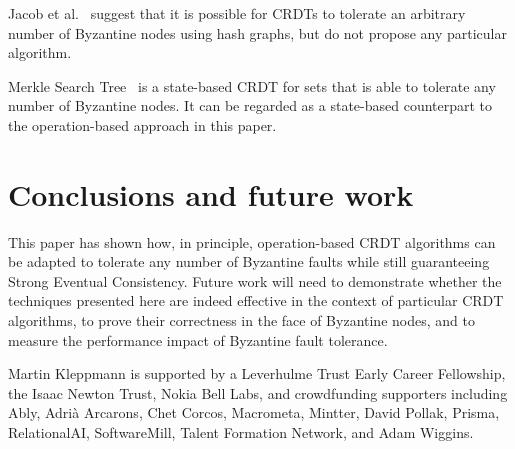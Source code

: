 \documentclass[sigplan,review]{acmart}
\begin{document}
Jacob et al.~\cite{Jacob:2021} suggest that it is possible for CRDTs to tolerate an arbitrary number of Byzantine nodes using hash graphs, but do not propose any particular algorithm.

Merkle Search Tree~\cite{Auvolat:2019} is a state-based CRDT for sets that is able to tolerate any number of Byzantine nodes.
It can be regarded as a state-based counterpart to the operation-based approach in this paper.

\section{Conclusions and future work}\label{sec:conclusions}

This paper has shown how, in principle, operation-based CRDT algorithms can be adapted to tolerate any number of Byzantine faults while still guaranteeing Strong Eventual Consistency.
Future work will need to demonstrate whether the techniques presented here are indeed effective in the context of particular CRDT algorithms, to prove their correctness in the face of Byzantine nodes, and to measure the performance impact of Byzantine fault tolerance.

\begin{acks}
Martin Kleppmann is supported by a Leverhulme Trust Early Career Fellowship, the Isaac Newton Trust, Nokia Bell Labs, and crowdfunding supporters including Ably, Adrià Arcarons, Chet Corcos, Macrometa, Mintter, David Pollak, Prisma, RelationalAI, SoftwareMill, Talent Formation Network, and Adam Wiggins.
\end{acks}



\end{document}
